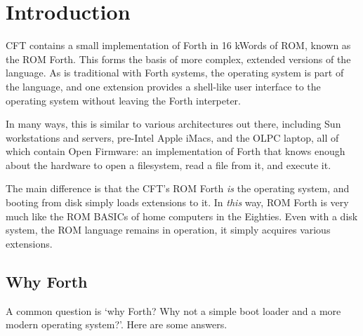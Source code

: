 
\chapter{Introduction}


CFT contains a small implementation of Forth in 16 kWords of ROM,
known as the ROM Forth. This forms the basis of more complex, extended
versions of the language. As is traditional with Forth systems, the
operating system is part of the language, and one extension provides a
shell-like user interface to the operating system without leaving the
Forth interpeter.

In many ways, this is similar to various architectures out there,
including Sun workstations and servers, pre-Intel Apple iMacs, and the
OLPC laptop, all of which contain Open Firmware: an implementation of
Forth that knows enough about the hardware to open a filesystem, read
a file from it, and execute it.

The main difference is that the CFT's ROM Forth {\em is\/} the
operating system, and booting from disk simply loads extensions to
it. In {\em this\/} way, ROM Forth is very much like the ROM BASICs of
home computers in the Eighties. Even with a disk system, the ROM
language remains in operation, it simply acquires various extensions.

\section{Why Forth}

A common question is ‘why Forth? Why not a simple boot loader and a
more modern operating system?’. Here are some answers.

